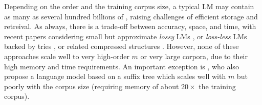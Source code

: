 Depending on the order and the training corpus size, a typical \ngram
LM may contain as many as several hundred billions of \ngrams
\cite{brants2007large},
raising challenges of efficient storage and retreival.
%
As always, there is a trade-off between accuracy, space, and time, with recent papers considering small but approximate  \emph{lossy} LMs 
\cite{Chazelle:2004:BFE:982792.982797,talbot_and_osborne_acl_2007,guthrie2010storing},
or \emph{loss-less} LMs 
backed by tries \cite{stolcke2011srilm},
or related compressed structures 
\cite{Germann:2009:TPT:1621947.1621952,heafield2011kenlm,pauls2011faster,sall11,DBLP:conf/acl/WatanabeTI09}.
However, none of these approaches scale well to very high-order $m$
or very large corpora, due to their high memory and time requirements.
An important exception is
, who also propose a language model
based on a suffix tree which scales well with $m$ but poorly with the corpus size (requiring memory of
about $20\times$ the training corpus).


%
% 


